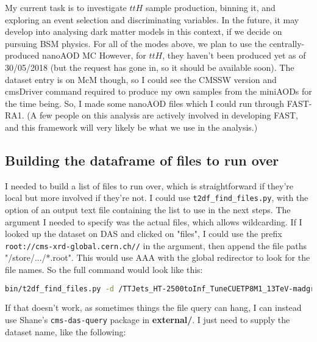 My current task is to investigate $ttH$ sample production, binning it, and exploring an event selection and discriminating variables. In the future, it may develop into analysing dark matter models in this context, if we decide on pursuing BSM physics. For all of the modes above, we plan to use the centrally-produced nanoAOD MC However, for $ttH$, they haven't been produced yet as of 30/05/2018 (but the request has gone in, so it should be available soon). The dataset entry is on McM though, so I could see the CMSSW version and cmsDriver command required to produce my own samples from the miniAODs for the time being. So, I made some nanoAOD files which I could run through FAST-RA1. (A few people on this analysis are actively involved in developing FAST, and this framework will very likely be what we use in the analysis.)


\subsection{Building the dataframe of files to run over}

I needed to build a list of files to run over, which is straightforward if they're local but more involved if they're not. I could use \texttt{t2df\_find\_files.py}, with the option of an output text file containing the list to use in the next steps. The argument I needed to specify was the actual files, which allows wildcarding. If I looked up the dataset on DAS and clicked on "files", I could use the prefix \texttt{root://cms-xrd-global.cern.ch//} in the argument, then append the file paths "/store/.../*.root". This would use AAA with the global redirector to look for the file names. So the full command would look like this:

\begin{lstlisting}[belowskip=-0.7cm, language=sh, numbers=none]
bin/t2df_find_files.py -d /TTJets_HT-2500toInf_TuneCUETP8M1_13TeV-madgraphMLM-pythia8/RunIISummer16NanoAOD-PUMoriond17_05Feb2018_94X_mcRun2_asymptotic_v2_ext1-v1/NANOAODSIM -o file_list_ttJets_2500toInf.txt --mc root://cms-xrd-global.cern.ch///store/mc/RunIISummer16NanoAOD/TTJets_HT-2500toInf_TuneCUETP8M1_13TeV-madgraphMLM-pythia8/NANOAODSIM/PUMoriond17_05Feb2018_94X_mcRun2_asymptotic_v2_ext1-v1/00000/*.root
\end{lstlisting}

If that doesn't work, as sometimes things the file query can hang, I can instead use Shane's \texttt{cms-das-query} package in \textbf{external/}. I just need to supply the dataset name, like the following:

